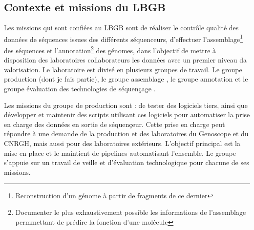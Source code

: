\subsection{Contexte et missions du LBGB}
Les missions qui sont confiées au LBGB sont de réaliser le contrôle qualité des données de séquences issues des différents séquenceurs, d'effectuer l'assemblage\footnote{Reconstruction d'un génome à partir de fragments de ce dernier} des séquences et l'annotation\footnote{Documenter le plus exhaustivement possible les informations de l'assemblage permmettant de prédire la fonction d'une molécule} des génomes, dans l'objectif de mettre à disposition des laboratoires collaborateurs les données avec un premier niveau da valorisation. Le laboratoire est divisé en plusieurs groupes de travail. Le groupe \og production \fg{} (dont je fais partie), le groupe \og assemblage \fg{}, le groupe \og annotation \fg{} et le groupe \og évaluation des technologies de séquençage \fg{}.

Les missions du groupe de \og production \fg{} sont : de tester des logiciels tiers, ainsi que développer et maintenir des scripts utilisant ces logiciels pour automatiser la prise en charge des données en sortie de séquençeur. Cette prise en charge peut répondre à une demande de la production et des laboratoires du Genoscope et du CNRGH, mais aussi pour des laboratoires extérieurs. L'objectif principal est la mise en place et le maintient de pipelines automatisant l'ensemble. Le groupe s'appuie sur un travail de veille et d'évaluation technologique pour chacune de ses missions. 



